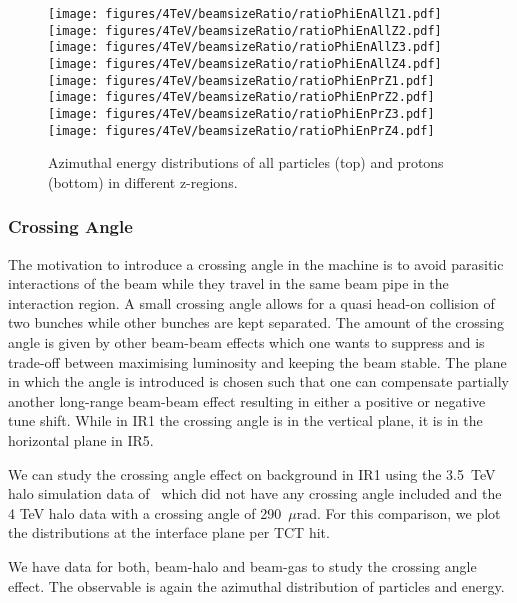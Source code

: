 \begin{figure}[!htb]
\begin{center}
  \texttt{[image: figures/4TeV/beamsizeRatio/ratioPhiEnAllZ1.pdf]}
  \texttt{[image: figures/4TeV/beamsizeRatio/ratioPhiEnAllZ2.pdf]}
  \texttt{[image: figures/4TeV/beamsizeRatio/ratioPhiEnAllZ3.pdf]}
  \texttt{[image: figures/4TeV/beamsizeRatio/ratioPhiEnAllZ4.pdf]}
  \texttt{[image: figures/4TeV/beamsizeRatio/ratioPhiEnPrZ1.pdf]}
  \texttt{[image: figures/4TeV/beamsizeRatio/ratioPhiEnPrZ2.pdf]}
  \texttt{[image: figures/4TeV/beamsizeRatio/ratioPhiEnPrZ3.pdf]}
  \texttt{[image: figures/4TeV/beamsizeRatio/ratioPhiEnPrZ4.pdf]}
\end{center}
\vspace{-0.6cm}
 \caption{Azimuthal energy distributions of all particles (top) and protons (bottom) in different z-regions.
  \label{bsZ}}
\end{figure}

\subsubsection{Crossing Angle}
The motivation to introduce a crossing angle in the machine is to avoid parasitic interactions of the beam while they travel in the same beam pipe in the interaction region. A small crossing angle allows for a quasi head-on collision of two bunches while other bunches are kept separated. The amount of the crossing angle is given by other beam-beam effects which one wants to suppress and is trade-off between maximising luminosity and keeping the beam stable. The plane in which the angle is introduced is chosen such that one can compensate partially another long-range beam-beam effect resulting in either a positive or negative tune shift. While in IR1 the crossing angle is in the vertical plane, it is in the horizontal plane in IR5.

We can study the crossing angle effect on background in IR1 using the 3.5~TeV halo simulation data of~\cite{nimPaperRod} which did not have any crossing angle included and the 4 TeV halo data with a crossing angle of 290~$\mu$rad. For this comparison, we plot the distributions at the interface plane per TCT hit. 

We have data for both, beam-halo and beam-gas to study the crossing angle effect. The observable is again the azimuthal distribution of particles and energy.\\

